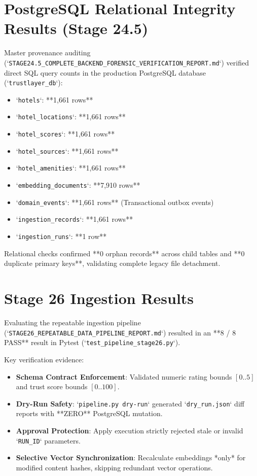 \section{PostgreSQL Relational Integrity Results (Stage 24.5)}
Master provenance auditing (`\texttt{STAGE24.5\_COMPLETE\_BACKEND\_FORENSIC\_VERIFICATION\_REPORT.md}`) verified direct SQL query counts in the production PostgreSQL database (`\texttt{trustlayer\_db}`):
\begin{itemize}
    \item `\texttt{hotels}`: **1,661 rows**
    \item `\texttt{hotel\_locations}`: **1,661 rows**
    \item `\texttt{hotel\_scores}`: **1,661 rows**
    \item `\texttt{hotel\_sources}`: **1,661 rows**
    \item `\texttt{hotel\_amenities}`: **1,661 rows**
    \item `\texttt{embedding\_documents}`: **7,910 rows**
    \item `\texttt{domain\_events}`: **1,661 rows** (Transactional outbox events)
    \item `\texttt{ingestion\_records}`: **1,661 rows**
    \item `\texttt{ingestion\_runs}`: **1 row**
\end{itemize}

Relational checks confirmed **0 orphan records** across child tables and **0 duplicate primary keys**, validating complete legacy file detachment.

\section{Stage 26 Ingestion Results}
Evaluating the repeatable ingestion pipeline (`\texttt{STAGE26\_REPEATABLE\_DATA\_PIPELINE\_REPORT.md}`) resulted in an **8 / 8 PASS** result in Pytest (`\texttt{test\_pipeline\_stage26.py}`).

Key verification evidence:
\begin{itemize}
    \item \textbf{Schema Contract Enforcement}: Validated numeric rating bounds $[0..5]$ and trust score bounds $[0..100]$.
    \item \textbf{Dry-Run Safety}: `\texttt{pipeline.py dry-run}` generated `\texttt{dry\_run.json}` diff reports with **ZERO** PostgreSQL mutation.
    \item \textbf{Approval Protection}: Apply execution strictly rejected stale or invalid `\texttt{RUN\_ID}` parameters.
    \item \textbf{Selective Vector Synchronization}: Recalculate embeddings *only* for modified content hashes, skipping redundant vector operations.
\end{itemize}

